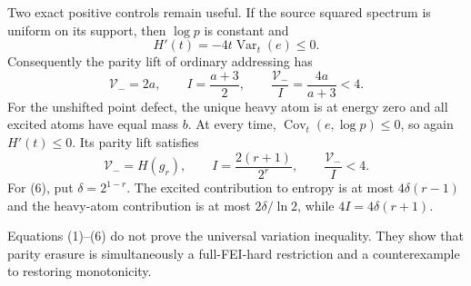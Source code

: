 Two exact positive controls remain useful.  If the source squared spectrum
is uniform on its support, then $\log p$ is constant and
\[
 H'(t)=-4t\operatorname{Var}_t(e)\le0.
\tag{4}
\]
Consequently the parity lift of ordinary addressing has
\[
 \mathcal V_-=2a,\qquad I=\frac{a+3}{2},\qquad
 \frac{\mathcal V_-}{I}=\frac{4a}{a+3}<4.
\tag{5}
\]
For the unshifted point defect, the unique heavy atom is at energy zero
and all excited atoms have equal mass $b$.  At every time,
$\operatorname{Cov}_t(e,\log p)\le0$, so again $H'(t)\le0$.  Its parity
lift satisfies
\[
 \mathcal V_-=H(g_r),\qquad I=\frac{2(r+1)}{2^r},\qquad
 \frac{\mathcal V_-}{I}<4.
\tag{6}
\]
For (6), put $\delta=2^{1-r}$.  The excited contribution to entropy is at
most $4\delta(r-1)$ and the heavy-atom contribution is at most
$2\delta/\ln2$, while $4I=4\delta(r+1)$.

Equations (1)--(6) do not prove the universal variation inequality.  They
show that parity erasure is simultaneously a full-FEI-hard restriction and
a counterexample to restoring monotonicity.
